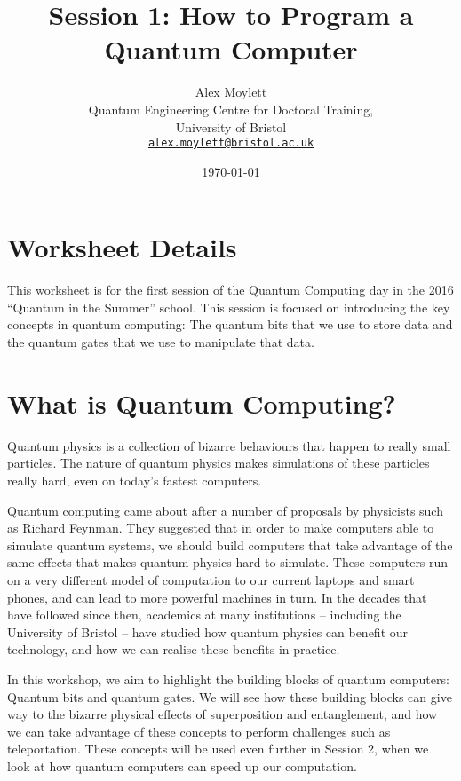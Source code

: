 \documentclass[twocolumn]{article}
\begin{document}
\lstset{style=Style1}

\title{Session 1: How to Program a Quantum Computer}
\author{Alex Moylett\\
        	Quantum Engineering Centre for Doctoral Training,\\
		University of Bristol\\
		\texttt{\href{mailto:alex.moylett@bristol.ac.uk}{alex.moylett@bristol.ac.uk}}
		}
\date{\today}
\maketitle

\section*{Worksheet Details}

This worksheet is for the first session of the Quantum Computing day in the 2016 ``Quantum in the Summer'' school. This session is focused on introducing the key concepts in quantum computing: The quantum bits that we use to store data and the quantum gates that we use to manipulate that data.

\section{What is Quantum Computing?}

Quantum physics is a collection of bizarre behaviours that happen to really small particles. The nature of quantum physics makes simulations of these particles really hard, even on today's fastest computers.

Quantum computing came about after a number of proposals by physicists such as Richard Feynman. They suggested that in order to make computers able to simulate quantum systems, we should build computers that take advantage of the same effects that makes quantum physics hard to simulate. These computers run on a very different model of computation to our current laptops and smart phones, and can lead to more powerful machines in turn. In the decades that have followed since then, academics at many institutions -- including the University of Bristol -- have studied how quantum physics can benefit our technology, and how we can realise these benefits in practice.

In this workshop, we aim to highlight the building blocks of quantum computers: Quantum bits and quantum gates. We will see how these building blocks can give way to the bizarre physical effects of superposition and entanglement, and how we can take advantage of these concepts to perform challenges such as teleportation. These concepts will be used even further in Session 2, when we look at how quantum computers can speed up our computation.
\end{document}

